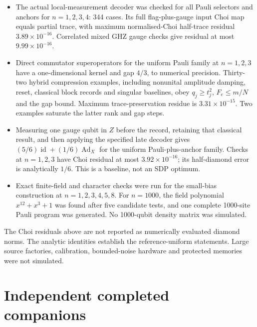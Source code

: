 \documentclass[11pt]{article}
\newcommand{\id}{\operatorname{id}}
\newcommand{\Ad}{\operatorname{Ad}}
\begin{document}
\begin{itemize}
\item The actual local-measurement decoder was checked for all Pauli selectors
and anchors for $n=1,2,3,4$: 344 cases. Its full flag-plus-gauge input Choi map
equals partial trace, with maximum normalised-Choi half-trace residual
$3.89\times10^{-16}$. Correlated mixed GHZ gauge checks give residual at most
$9.99\times10^{-16}$.
\item Direct commutator superoperators for the uniform Pauli family at
$n=1,2,3$ have a one-dimensional kernel and gap $4/3$, to numerical precision.
Thirty-two hybrid compression examples, including nonunital amplitude damping,
reset, classical block records and singular baselines, obey $q_j\ge t_j^2$,
$F_e\le m/N$ and the gap bound. Maximum trace-preservation residue is
$3.31\times10^{-15}$. Two examples saturate the latter rank and gap steps.
\item Measuring one gauge qubit in $Z$ before the record, retaining that
classical result, and then applying the specified late decoder gives
$(5/6)\id+(1/6)\Ad_X$ for the uniform Pauli-plus-anchor family.
Checks at $n=1,2,3$ have Choi residual at most $3.92\times10^{-16}$; its
half-diamond error is analytically $1/6$. This is a baseline, not an SDP optimum.
\item Exact finite-field and character checks were run for the small-bias
construction at $n=1,2,3,4,5,8$. For $n=1000$, the field polynomial
$x^{12}+x^3+1$ was found after five candidate tests, and one complete 1000-site
Pauli program was generated. No 1000-qubit density matrix was simulated.
\end{itemize}
The Choi residuals above are not reported as numerically evaluated diamond
norms. The analytic identities establish the reference-uniform statements.
Large source factories, calibration, bounded-noise hardware and protected
memories were not simulated.

\section{Independent completed companions}\label{sec:companions}
\end{document}
